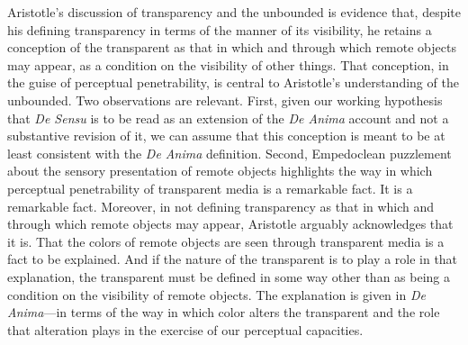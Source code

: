 Aristotle's discussion of transparency and the unbounded is evidence that, despite his defining transparency in terms of the manner of its visibility, he retains a conception of the transparent as that in which and through which remote objects may appear, as a condition on the visibility of other things. That conception, in the guise of perceptual penetrability, is central to Aristotle's understanding of the unbounded. Two observations are relevant. First, given our working hypothesis that \emph{De Sensu} is to be read as an extension of the \emph{De Anima} account and not a substantive revision of it, we can assume that this conception is meant to be at least consistent with the \emph{De Anima} definition.  Second, Empedoclean puzzlement about the sensory presentation of remote objects highlights the way in which perceptual penetrability of transparent media is a remarkable fact. It is a remarkable fact. Moreover, in not defining transparency as that in which and through which remote objects may appear, Aristotle arguably acknowledges that it is. That the colors of remote objects are seen through transparent media is a fact to be explained. And if the nature of the transparent is to play a role in that explanation, the transparent must be defined in some way other than as being a condition on the visibility of remote objects. The explanation is given in \emph{De Anima}---in terms of the way in which color alters the transparent and the role that alteration plays in the exercise of our perceptual capacities.


